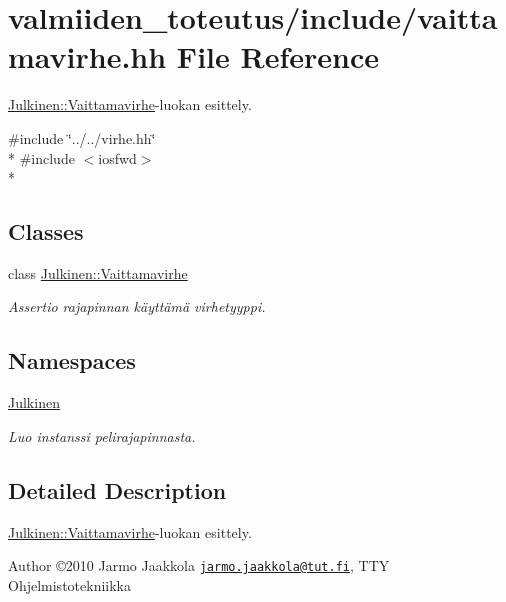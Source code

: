 \hypertarget{vaittamavirhe_8hh}{}\section{valmiiden\+\_\+toteutus/include/vaittamavirhe.hh File Reference}
\label{vaittamavirhe_8hh}


\hyperlink{class_julkinen_1_1_vaittamavirhe}{Julkinen\+::\+Vaittamavirhe}-\/luokan esittely.  


{\ttfamily \#include \char`\"{}../../virhe.\+hh\char`\"{}}\\*
{\ttfamily \#include $<$iosfwd$>$}\\*
\subsection*{Classes}
\begin{DoxyCompactItemize}
\item 
class \hyperlink{class_julkinen_1_1_vaittamavirhe}{Julkinen\+::\+Vaittamavirhe}
\begin{DoxyCompactList}\small\item\em Assertio rajapinnan käyttämä virhetyyppi. \end{DoxyCompactList}\end{DoxyCompactItemize}
\subsection*{Namespaces}
\begin{DoxyCompactItemize}
\item 
 \hyperlink{namespace_julkinen}{Julkinen}
\begin{DoxyCompactList}\small\item\em Luo instanssi pelirajapinnasta. \end{DoxyCompactList}\end{DoxyCompactItemize}


\subsection{Detailed Description}
\hyperlink{class_julkinen_1_1_vaittamavirhe}{Julkinen\+::\+Vaittamavirhe}-\/luokan esittely. 

\begin{DoxyAuthor}{Author}
©2010 Jarmo Jaakkola \href{mailto:jarmo.jaakkola@tut.fi}{\tt jarmo.\+jaakkola@tut.\+fi}, T\+T\+Y Ohjelmistotekniikka 
\end{DoxyAuthor}
